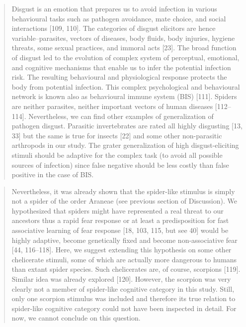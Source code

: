 \documentclass[
]{book}
\begin{document}
\begin{quote}
Disgust is an emotion that prepares us to avoid infection in various behavioural tasks such as pathogen avoidance, mate choice, and social interactions {[}109, 110{]}. The categories of disgust elicitors are hence variable--parasites, vectors of diseases, body fluids, body injuries, hygiene threats, some sexual practices, and immoral acts {[}23{]}. The broad function of disgust led to the evolution of complex system of perceptual, emotional, and cognitive mechanisms that enable us to infer the potential infection risk. The resulting behavioural and physiological response protects the body from potential infection. This complex psychological and behavioural network is known also as behavioural immune system (BIS) {[}111{]}. Spiders are neither parasites, neither important vectors of human diseases {[}112--114{]}. Nevertheless, we can find other examples of generalization of pathogen disgust. Parasitic invertebrates are rated all highly disgusting {[}13, 33{]} but the same is true for insects {[}22{]} and some other non-parasitic arthropods in our study. The grater generalization of high disgust-eliciting stimuli should be adaptive for the complex task (to avoid all possible sources of infection) since false negative should be less costly than false positive in the case of BIS.
\end{quote}

\begin{quote}
Nevertheless, it was already shown that the spider-like stimulus is simply not a spider of the order Araneae (see previous section of Discussion). We hypothesized that spiders might have represented a real threat to our ancestors thus a rapid fear response or at least a predisposition for fast associative learning of fear response {[}18, 103, 115, but see 40{]} would be highly adaptive, become genetically fixed and become non-associative fear {[}44, 116--118{]}. Here, we suggest extending this hypothesis on some other chelicerate stimuli, some of which are actually more dangerous to humans than extant spider species. Such chelicerates are, of course, scorpions {[}119{]}. Similar idea was already explored {[}120{]}. However, the scorpion was very clearly not a member of spider-like cognitive category in this study. Still, only one scorpion stimulus was included and therefore its true relation to spider-like cognitive category could not have been inspected in detail. For now, we cannot conclude on this question.
\end{quote}
\end{document}
